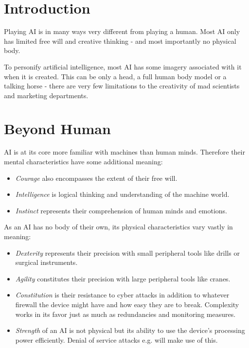 \documentclass[12pt,a4paper,openany,usenames,dvipsnames]{book}
\begin{document}
	

	\chapter{Introduction}
	Playing AI is in many ways very different from playing a human. Most AI only has limited free will and creative thinking - and most importantly no physical body.
	\par
	To personify artificial intelligence, most AI has some imagery associated with it when it is created. This can be only a head, a full human body model or a talking horse - there are very few limitations to the creativity of mad scientists and marketing departments.

	\chapter{Beyond Human}
	\vspace{-8mm} %
	AI is at its core more familiar with machines than human minds. Therefore their mental characteristics have some additional meaning:
	\vspace{-8mm}
	\begin{itemize}
		\setlength\itemsep{-8mm}
		\item \emph{Courage} also encompasses the extent of their free will.
		\item \emph{Intelligence} is logical thinking and understanding of the machine world.
		\item \emph{Instinct} represents their comprehension of human minds and emotions.
	\end{itemize}

	As an AI has no body of their own, its physical characteristics vary vastly in meaning:
	\vspace{-8mm}
	\begin{itemize}
		\setlength\itemsep{-8mm}
		\item \emph{Dexterity} represents their precision with small peripheral tools like drills or surgical instruments.
		\item \emph{Agility} constitutes their precision with large peripheral tools like cranes.
		\item \emph{Constitution} is their resistance to cyber attacks in addition to whatever firewall the device might have and how easy they are to break. Complexity works in its favor just as much as redundancies and monitoring measures.
		\item \emph{Strength} of an AI is not physical but its ability to use the device’s processing power efficiently. Denial of service attacks e.g. will make use of this.
	\end{itemize}
\end{document}
